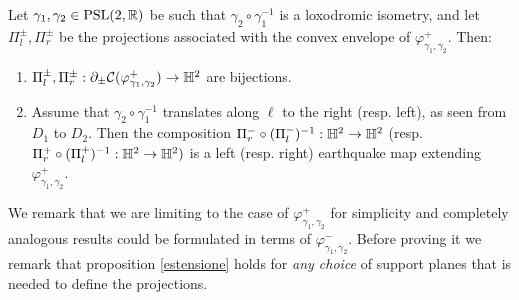  \begin{proposition}\label{estensione}
     Let $\gamma_1,\gamma_2 \in \text{PSL}(2,\mathbb{R})$ be such that $\gamma_2\circ\gamma_1^{-1}$ is a loxodromic isometry, and let $\Pi_l^\pm, \Pi_r^\pm$ be the projections associated with the convex envelope of $\varphi_{\gamma_1,\gamma_2}^+.$ Then:
     \begin{enumerate}
         \item $\Pi_l^\pm, \Pi_r^\pm:\partial_\pm\mathcal{C}(\varphi_{\gamma_1,\gamma_2}^+)\to\mathbb{H}^2$ are bijections.
         \item Assume that $\gamma_2\circ\gamma_1^{-1}$ translates along $\ell$ to the right (resp. left), as seen from $D_1$ to $D_2.$ Then the composition $\Pi_r^-\circ(\Pi_l^-)^{-1}:\mathbb{H}^2\to\mathbb{H}^2$ (resp. $\Pi_r^+\circ(\Pi_l^+)^{-1}:\mathbb{H}^2\to\mathbb{H}^2)$ is a left (resp. right) earthquake map extending $\varphi_{\gamma_1,\gamma_2}^+.$
     \end{enumerate} 
 \end{proposition}

 We remark that we are limiting to the case of $\varphi_{\gamma_1,\gamma_2}^+$ for simplicity and completely analogous results could be formulated in terms of $\varphi_{\gamma_1,\gamma_2}^-.$ Before proving it we remark that proposition \ref{estensione} holds for \textit{any choice}  of support planes that is needed to define the projections.

